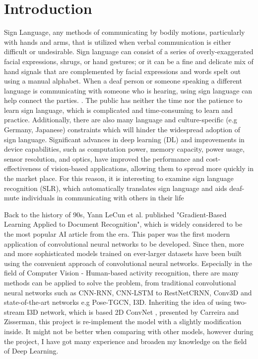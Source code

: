 \documentclass[a4paper, 12pt]{article}
\begin{document}




\section{Introduction}
Sign Language, any methods of communicating by bodily motions, particularly with hands and arms, that is utilized when verbal communication is either difficult or undesirable. Sign language can consist of a series of overly-exaggerated facial expressions, shrugs, or hand gestures; or it can be a fine and delicate mix of hand signals that are complemented by facial expressions and words spelt out using a manual alphabet. When a deaf person or someone speaking a different language is communicating with someone who is hearing, using sign language can help connect the parties. \citep{signlanguagedefinition2020}. The public has neither the time nor the patience to learn sign language, which is complicated and time-consuming to learn and practice. Additionally, there are also many language and culture-specific \citep{holtz2014reading} (e.g Germany, Japanese) constraints which will hinder the widespread adoption of sign language.
Significant advances in deep learning (DL) and improvements in device capabilities, such as computation power, memory capacity, power usage, sensor resolution, and optics, have improved the performance and cost-effectiveness of vision-based applications, allowing them to spread more quickly in the market place.
For this reason, it is interesting to examine sign language recognition (SLR), which automatically translates sign language and aids deaf-mute individuals in communicating with others in their life

Back to the history of 90s, Yann LeCun et al. published "Gradient-Based Learning Applied to Document Recognition", which is widely considered to be the most popular AI article from the era. This paper was the first modern application of convolutional neural networks to be developed.
Since then, more and more sophisticated models trained on ever-larger datasets have been built using the convenient approach of convolutional neural networks. Especially in the field of Computer Vision - Human-based activity recognition, there are many methods can be applied to solve the problem, from traditional convolutional neural networks such as CNN-RNN, CNN-LSTM to RestNetCRNN, Conv3D and state-of-the-art networks e.g Pose-TGCN, I3D.
Inheriting the idea of using two-stream I3D network, which is based 2D ConvNet \citep{carreira2017quo}, presented by Carreira and Zisserman, this project is re-implement the model with a slightly modification inside. It might not be better when comparing with other models, however during the project, I have got many experience and broaden my knowledge on the field of Deep Learning. 
\end{document}
